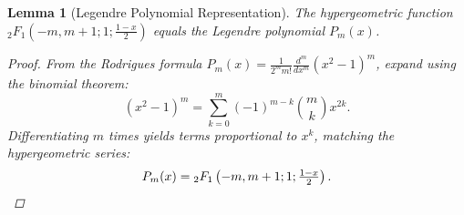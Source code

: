 \documentclass[12pt]{article}
\newtheorem{lemma}[theorem]{Lemma}
\begin{document}

\begin{lemma}[Legendre Polynomial Representation]\label{lem:Legendre}
The hypergeometric function \( {}_2F_1(-m, m+1; 1; \tfrac{1-x}{2}) \) equals the Legendre polynomial \( P_m(x) \).

\begin{proof}
From the Rodrigues formula \( P_m(x) = \frac{1}{2^m m!} \frac{d^m}{dx^m} (x^2 - 1)^m \), expand using the binomial theorem:
\[
(x^2 - 1)^m = \sum_{k=0}^m (-1)^{m-k} \binom{m}{k} x^{2k}.
\]
Differentiating \( m \) times yields terms proportional to \( x^k \), matching the hypergeometric series:
\[
P_m(x) = {}_2F_1\left(-m, m+1; 1; \tfrac{1 - x}{2}\right). \qedhere
\]
\end{proof}
\end{lemma}

\end{document}
